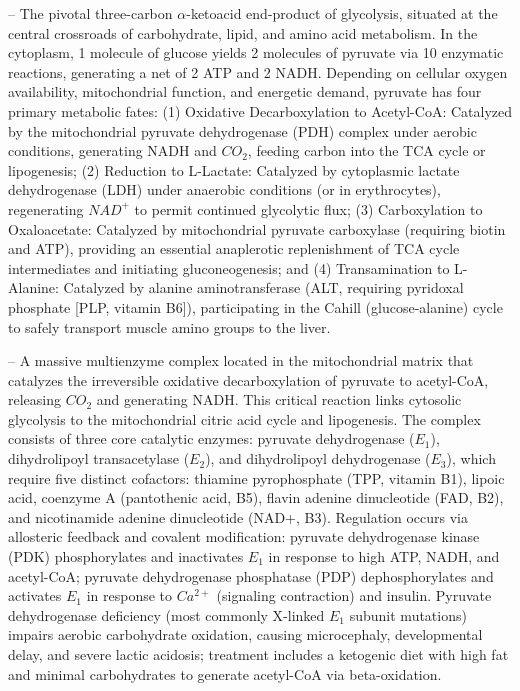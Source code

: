 -- The pivotal three-carbon $\alpha$-ketoacid end-product of glycolysis, situated at the central crossroads of carbohydrate, lipid, and amino acid metabolism. In the cytoplasm, 1 molecule of glucose yields 2 molecules of pyruvate via 10 enzymatic reactions, generating a net of 2 ATP and 2 NADH. Depending on cellular oxygen availability, mitochondrial function, and energetic demand, pyruvate has four primary metabolic fates: (1) Oxidative Decarboxylation to Acetyl-CoA: Catalyzed by the mitochondrial pyruvate dehydrogenase (PDH) complex under aerobic conditions, generating NADH and $CO_2$, feeding carbon into the TCA cycle or lipogenesis; (2) Reduction to L-Lactate: Catalyzed by cytoplasmic lactate dehydrogenase (LDH) under anaerobic conditions (or in erythrocytes), regenerating $NAD^+$ to permit continued glycolytic flux; (3) Carboxylation to Oxaloacetate: Catalyzed by mitochondrial pyruvate carboxylase (requiring biotin and ATP), providing an essential anaplerotic replenishment of TCA cycle intermediates and initiating gluconeogenesis; and (4) Transamination to L-Alanine: Catalyzed by alanine aminotransferase (ALT, requiring pyridoxal phosphate [PLP, vitamin B6]), participating in the Cahill (glucose-alanine) cycle to safely transport muscle amino groups to the liver.

-- A massive multienzyme complex located in the mitochondrial matrix that catalyzes the irreversible oxidative decarboxylation of pyruvate to acetyl-CoA, releasing $CO_2$ and generating NADH. This critical reaction links cytosolic glycolysis to the mitochondrial citric acid cycle and lipogenesis. The complex consists of three core catalytic enzymes: pyruvate dehydrogenase ($E_1$), dihydrolipoyl transacetylase ($E_2$), and dihydrolipoyl dehydrogenase ($E_3$), which require five distinct cofactors: thiamine pyrophosphate (TPP, vitamin B1), lipoic acid, coenzyme A (pantothenic acid, B5), flavin adenine dinucleotide (FAD, B2), and nicotinamide adenine dinucleotide (NAD+, B3). Regulation occurs via allosteric feedback and covalent modification: pyruvate dehydrogenase kinase (PDK) phosphorylates and inactivates $E_1$ in response to high ATP, NADH, and acetyl-CoA; pyruvate dehydrogenase phosphatase (PDP) dephosphorylates and activates $E_1$ in response to $Ca^{2+}$ (signaling contraction) and insulin. Pyruvate dehydrogenase deficiency (most commonly X-linked $E_1$ subunit mutations) impairs aerobic carbohydrate oxidation, causing microcephaly, developmental delay, and severe lactic acidosis; treatment includes a ketogenic diet with high fat and minimal carbohydrates to generate acetyl-CoA via beta-oxidation.

